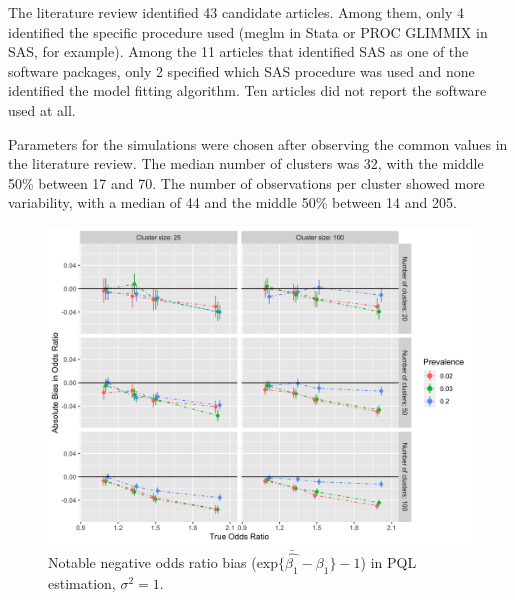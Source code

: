 \documentclass[Afour,times,sagev,doublespace]{sagej}
\begin{document}
The literature review identified 43 candidate articles. Among them, only 4 identified the specific procedure used (meglm in Stata or PROC GLIMMIX in SAS, for example). Among the 11 articles that identified SAS as one of the software packages, only 2 specified which SAS procedure was used and none identified the model fitting algorithm. Ten articles did not report the software used at all.

Parameters for the simulations were chosen after observing the common values in the literature review. The median number of clusters was 32, with the middle 50\% between 17 and 70. The number of observations per cluster showed more variability, with a median of 44 and the middle 50\% between 14 and 205.

\begin{figure}
\centering
\includegraphics[width=\linewidth]{_bias_pql_sbs1.png}
  \caption{Notable negative odds ratio bias ($\text{exp} \{ \bar{\hat{\beta_1}} - \beta_1 \}-1$) in PQL estimation, $\sigma^2=1$.}
    \label{fig:_bias_pql_6}
\end{figure}
\end{document}

